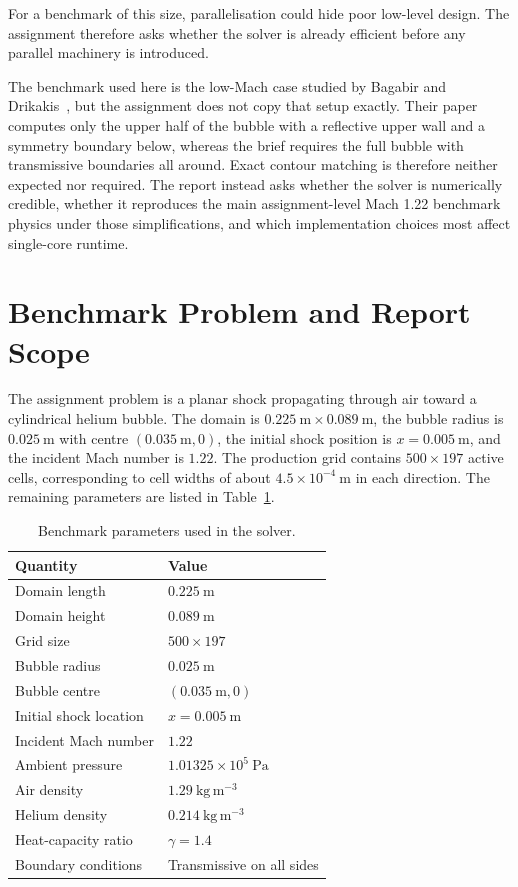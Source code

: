 \documentclass[final,3p,times,twocolumn]{elsarticle}
\begin{document}
For a benchmark of this size, parallelisation could hide poor low-level design. The assignment therefore asks whether the solver is already efficient before any parallel machinery is introduced.

The benchmark used here is the low-Mach case studied by Bagabir and Drikakis~\cite{bagabir2001}, but the assignment does not copy that setup exactly. Their paper computes only the upper half of the bubble with a reflective upper wall and a symmetry boundary below, whereas the brief requires the full bubble with transmissive boundaries all around. Exact contour matching is therefore neither expected nor required. The report instead asks whether the solver is numerically credible, whether it reproduces the main assignment-level Mach 1.22 benchmark physics under those simplifications, and which implementation choices most affect single-core runtime.

\section{Benchmark Problem and Report Scope}

The assignment problem is a planar shock propagating through air toward a cylindrical helium bubble. The domain is $0.225~\mathrm{m} \times 0.089~\mathrm{m}$, the bubble radius is $0.025~\mathrm{m}$ with centre $(0.035~\mathrm{m},0)$, the initial shock position is $x = 0.005~\mathrm{m}$, and the incident Mach number is $1.22$. The production grid contains $500 \times 197$ active cells, corresponding to cell widths of about $4.5 \times 10^{-4}~\mathrm{m}$ in each direction. The remaining parameters are listed in Table~\ref{tab:benchmark}.

\begin{table}[t]
\centering
\caption{Benchmark parameters used in the solver.}
\label{tab:benchmark}
\begin{tabular}{ll}
\toprule
Quantity & Value \\
\midrule
Domain length & $0.225~\mathrm{m}$ \\
Domain height & $0.089~\mathrm{m}$ \\
Grid size & $500 \times 197$ \\
Bubble radius & $0.025~\mathrm{m}$ \\
Bubble centre & $(0.035~\mathrm{m}, 0)$ \\
Initial shock location & $x = 0.005~\mathrm{m}$ \\
Incident Mach number & $1.22$ \\
Ambient pressure & $1.01325 \times 10^5~\mathrm{Pa}$ \\
Air density & $1.29~\mathrm{kg\,m^{-3}}$ \\
Helium density & $0.214~\mathrm{kg\,m^{-3}}$ \\
Heat-capacity ratio & $\gamma = 1.4$ \\
Boundary conditions & Transmissive on all sides \\
\bottomrule
\end{tabular}
\end{table}
\end{document}

